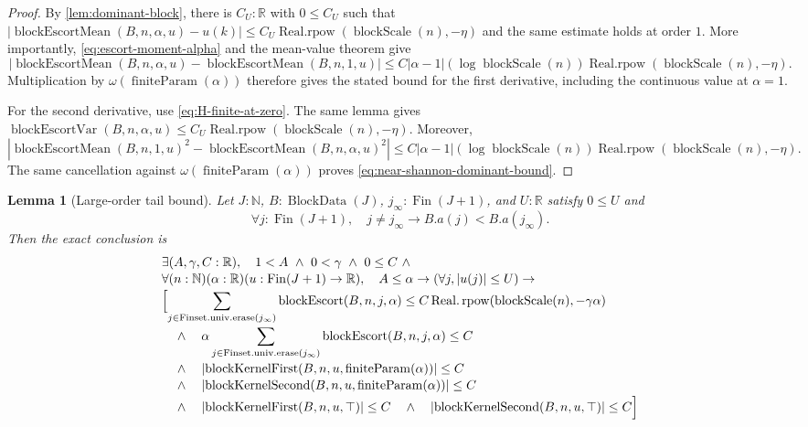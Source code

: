 \documentclass[9pt]{extarticle}
\newtheorem{lemma}{Lemma}[section]
\theoremstyle{definition}
\theoremstyle{remark}
\newcommand{\R}{\mathbb R}
\newcommand{\N}{\mathbb N}
\newcommand{\abs}[1]{\left\lvert #1\right\rvert}
\begin{document}
\begin{proof}
By \cref{lem:dominant-block}, there is $C_U:\R$ with $0\leq C_U$ such that
$\abs{\operatorname{blockEscortMean}(B,n,\alpha,u)-u(k)}
 \leq C_U\operatorname{Real.rpow}(\operatorname{blockScale}(n),-\eta)$
and the same estimate holds
at order $1$. More importantly,
\cref{eq:escort-moment-alpha} and the mean-value theorem give
\[
 \abs{\operatorname{blockEscortMean}(B,n,\alpha,u)
       -\operatorname{blockEscortMean}(B,n,1,u)}
 \leq C\abs{\alpha-1}(\log\operatorname{blockScale}(n))
       \operatorname{Real.rpow}(\operatorname{blockScale}(n),-\eta).
\]
Multiplication by $\omega(\operatorname{finiteParam}(\alpha))$ therefore gives the stated bound for the
first derivative, including the continuous value at $\alpha=1$.

For the second derivative, use \cref{eq:H-finite-at-zero}. The same lemma
gives
$\operatorname{blockEscortVar}(B,n,\alpha,u)
 \leq C_U\operatorname{Real.rpow}(\operatorname{blockScale}(n),-\eta)$. Moreover,
\[
 \abs{\operatorname{blockEscortMean}(B,n,1,u)^2
       -\operatorname{blockEscortMean}(B,n,\alpha,u)^2}
 \leq C\abs{\alpha-1}(\log\operatorname{blockScale}(n))
       \operatorname{Real.rpow}(\operatorname{blockScale}(n),-\eta).
\]
The same cancellation against $\omega(\operatorname{finiteParam}(\alpha))$ proves
\cref{eq:near-shannon-dominant-bound}.
\end{proof}

\begin{lemma}[Large-order tail bound]\label{lem:large-alpha-tail}
Let $J:\N$, $B:\operatorname{BlockData}(J)$,
$j_\infty:\operatorname{Fin}(J+1)$, and $U:\R$ satisfy $0\leq U$ and
\[
 \forall j:\operatorname{Fin}(J+1),\quad
 j\neq j_\infty\to B.a(j)<B.a(j_\infty).
\]
Then the exact conclusion is
\begin{align}
 &\exists(A,\gamma,C:\R),\quad
 1<A\ \wedge\ 0<\gamma\ \wedge\ 0\leq C\ \wedge\\[-2pt]
 &\forall(n:\N)(\alpha:\R)
  (u:\operatorname{Fin}(J+1)\to\R),\quad
 A\leq\alpha\to(\forall j,\abs{u(j)}\leq U)\to\\[-2pt]
 &\Bigl[
 \sum_{j\in\operatorname{Finset.univ.erase}(j_\infty)}
  \operatorname{blockEscort}(B,n,j,\alpha)
 \leq C\operatorname{Real.rpow}
    (\operatorname{blockScale}(n),-\gamma\alpha)\\[-2pt]
 &\quad\wedge\quad
 \alpha\sum_{j\in\operatorname{Finset.univ.erase}(j_\infty)}
  \operatorname{blockEscort}(B,n,j,\alpha)\leq C
 \label{eq:large-alpha-escort}\\[-2pt]
 &\quad\wedge\quad
 \abs{\operatorname{blockKernelFirst}
   (B,n,u,\operatorname{finiteParam}(\alpha))}\leq C\\[-2pt]
 &\quad\wedge\quad
 \abs{\operatorname{blockKernelSecond}
   (B,n,u,\operatorname{finiteParam}(\alpha))}\leq C\\[-2pt]
 &\quad\wedge\quad
 \abs{\operatorname{blockKernelFirst}(B,n,u,\top)}\leq C
 \quad\wedge\quad
 \abs{\operatorname{blockKernelSecond}(B,n,u,\top)}\leq C
 \Bigr]
\end{align}
\end{lemma}
\end{document}
